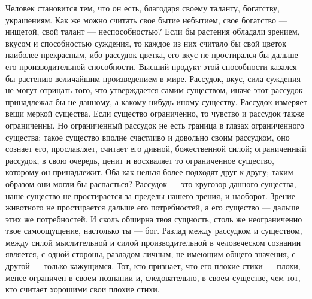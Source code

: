 \documentclass[12pt,oneside]{book}
\begin{document}
Человек становится тем, что он есть, благодаря своему таланту, богатству, украшениям. Как же можно считать свое бытие небытием, свое богатство --- нищетой, свой талант --- неспособностью? Если бы растения обладали зрением, вкусом и способностью суждения, то каждое из них считало бы свой цветок наиболее прекрасным, ибо рассудок цветка, его вкус не простирался бы дальше его производительной способности. Высший продукт этой способности казался бы растению величайшим произведением в мире. Рассудок, вкус, сила суждения не могут отрицать того, что утверждается самим существом, иначе этот рассудок принадлежал бы не данному, а какому-нибудь иному существу. Рассудок измеряет вещи меркой существа. Если существо ограниченно, то чувство и рассудок также ограниченны. Но ограниченный рассудок не есть граница в глазах ограниченного существа; такое существо вполне счастливо и довольно своим рассудком, оно сознает его, прославляет, считает его дивной, божественной силой; ограниченный рассудок, в свою очередь, ценит и восхваляет то ограниченное существо, которому он принадлежит. Оба как нельзя более подходят друг к другу; таким образом они могли бы распасться? Рассудок --– это кругозор данного существа, наше существо не простирается за пределы нашего зрения, и наоборот. Зрение животного не простирается дальше его потребностей, а его существо --- дальше этих же потребностей. И сколь обширна твоя сущность, столь же неограниченно твое самоощущение, настолько ты --- бог. Разлад между рассудком и существом, между силой мыслительной и силой производительной в человеческом сознании является, с одной стороны, разладом личным, не имеющим общего значения, с другой --- только кажущимся. Тот, кто признает, что его плохие стихи --- плохи, менее ограничен в своем познании и, следовательно, в своем существе, чем тот, кто считает хорошими свои плохие стихи.
\end{document}
